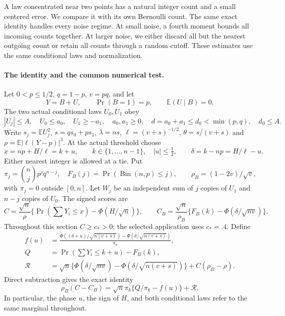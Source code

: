 A law concentrated near two points has a natural integer count and a small
centered error. We compare it with its own Bernoulli count. The same exact
identity handles every noise regime. At small noise, a fourth moment bounds
all incoming counts together. At larger noise, we either discard all but
the nearest outgoing count or retain all counts through a random cutoff.
These estimates use the same conditional laws and normalization.

\paragraph{The identity and the common numerical test.}

Let $0<p\le1/2$, $q=1-p$, $v=pq$, and let
\[
 Y=B+U,\qquad \Pr(B=1)=p,\qquad \mathbb E(U\mid B)=0.
\]
The two actual conditional laws $U_0,U_1$ obey
\begin{equation}\label{j:local:shortloc:support}
 |U_j|\le A,\quad U_0\le a_0,\quad U_1\ge-a_1,\quad
 a_0,a_1\ge0,\quad d=a_0+a_1\le d_0<\min(p,q),\quad d_0\le A.
\end{equation}
Write $s_j=\mathbb E U_j^2$, $s=qs_0+ps_1$, $\lambda=ns$,
$\ell=(v+s)^{-1/2}$, $\theta=s/(v+s)$ and
$\rho=\mathbb E|\ell(Y-p)|^3$. At the actual threshold choose
\[
 x=np+H/\ell=k+u,\qquad k\in\{1,\ldots,n-1\},\quad |u|\le\tfrac12,
 \qquad \delta=k-np=H/\ell-u.
\]
Either nearest integer is allowed at a tie. Put
\[
 \pi_j=\binom njp^jq^{n-j},\quad F_B(j)=\Pr(\operatorname{Bin}(n,p)\le j),
 \qquad \rho_B=(1-2v)/\sqrt v,
\]
with $\pi_j=0$ outside $[0,n]$. Let $W_j$ be an independent sum of $j$
copies of $U_1$ and $n-j$ copies of $U_0$. The signed scores are
\[
 C=\frac{\sqrt n}{\rho}\{\Pr(\textstyle\sum Y_i\le x)-\Phi(H/\sqrt n)\},
 \qquad C_B=\frac{\sqrt n}{\rho_B}\{F_B(k)-\Phi(\delta/\sqrt{nv})\}.
\]
Throughout this section $C\ge c_*>0$; the selected application uses $c_*=.4$.
Define
\begin{align}
 f(u)&=\frac{\Phi((\delta+u)/\sqrt{n(v+s)})-
                    \Phi(\delta/\sqrt{n(v+s)})}{\pi_k},\label{j:local:shortloc:f}\\
 Q&=\Pr(\textstyle\sum Y_i\le k+u)-F_B(k),\nonumber\\
 \mathcal R&=\sqrt n\{\Phi(\delta/\sqrt{nv})-
                 \Phi(\delta/\sqrt{n(v+s)})\}+C(\rho_B-\rho).\nonumber
\end{align}
Direct subtraction gives the exact identity
\begin{equation}\label{j:local:shortloc:master}
 \rho_B(C-C_B)=\sqrt n\pi_k\{Q/\pi_k-f(u)\}+\mathcal R.
\end{equation}
In particular, the phase $u$, the sign of $H$, and both conditional laws
refer to the same marginal throughout.

